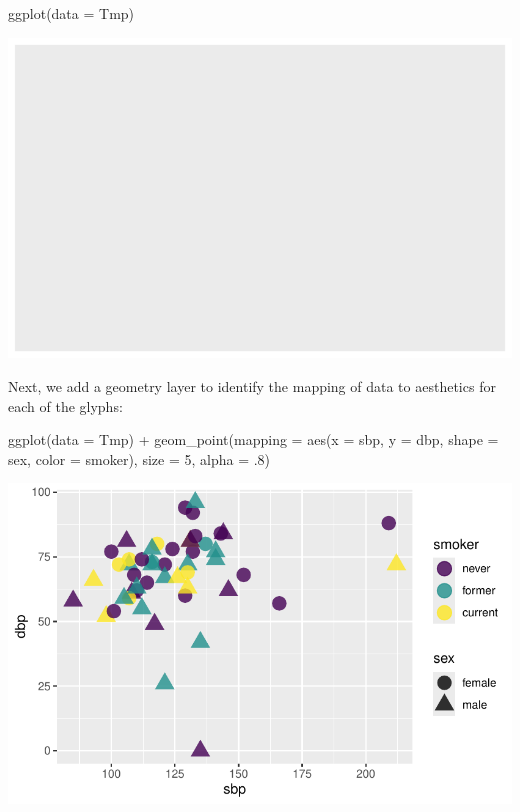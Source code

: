 \documentclass[
  letterpaper,
  DIV=11,
  numbers=noendperiod]{scrreprt}
\newenvironment{Shaded}{\begin{snugshade}}{\end{snugshade}}
\newcommand{\AttributeTok}[1]{\textcolor[rgb]{0.40,0.45,0.13}{#1}}
\newcommand{\DecValTok}[1]{\textcolor[rgb]{0.68,0.00,0.00}{#1}}
\newcommand{\FunctionTok}[1]{\textcolor[rgb]{0.28,0.35,0.67}{#1}}
\newcommand{\NormalTok}[1]{\textcolor[rgb]{0.00,0.23,0.31}{#1}}
\newcommand{\SpecialCharTok}[1]{\textcolor[rgb]{0.37,0.37,0.37}{#1}}
\begin{document}
\begin{Shaded}
\begin{Highlighting}[]
\FunctionTok{ggplot}\NormalTok{(}\AttributeTok{data =}\NormalTok{ Tmp)}
\end{Highlighting}
\end{Shaded}

\includegraphics{src/02-Intro_Data_Viz_files/figure-pdf/unnamed-chunk-4-1.pdf}

Next, we add a geometry layer to identify the mapping of data to
aesthetics for each of the glyphs:

\begin{Shaded}
\begin{Highlighting}[]
\FunctionTok{ggplot}\NormalTok{(}\AttributeTok{data =}\NormalTok{ Tmp) }\SpecialCharTok{+}
  \FunctionTok{geom\_point}\NormalTok{(}\AttributeTok{mapping =} \FunctionTok{aes}\NormalTok{(}\AttributeTok{x =}\NormalTok{ sbp, }\AttributeTok{y =}\NormalTok{ dbp, }\AttributeTok{shape =}\NormalTok{ sex, }\AttributeTok{color =}\NormalTok{ smoker), }\AttributeTok{size =} \DecValTok{5}\NormalTok{, }\AttributeTok{alpha =}\NormalTok{ .}\DecValTok{8}\NormalTok{)}
\end{Highlighting}
\end{Shaded}

\includegraphics{src/02-Intro_Data_Viz_files/figure-pdf/unnamed-chunk-5-1.pdf}
\end{document}
